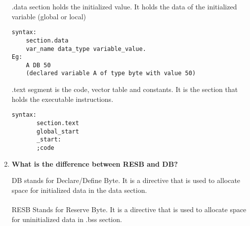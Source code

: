 \documentclass[11pt]{article}
\begin{document}
\begin{enumerate}
.data section holds the initialized value. It holds the data of the initialized variable (global or local)
\begin{verbatim}
syntax:
    section.data
    var_name data_type variable_value.
Eg:
    A DB 50
    (declared variable A of type byte with value 50)

\end{verbatim}

.text segment is the code, vector table and constants. It is the section that holds the executable instructions. 
\begin{verbatim}
syntax:
       section.text
       global_start
       _start:
       ;code
\end{verbatim}

\item {\textbf{What is the difference between RESB and DB?}}

DB stands for Declare/Define Byte. It is a directive that is used to allocate space for initialized data in the data section.\\
\\
RESB Stands for Reserve Byte. It is a directive that is used to allocate space for uninitialized data in .bss section.

\end{enumerate}
\end{document}
